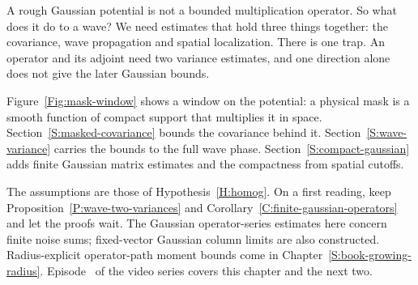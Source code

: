 A rough Gaussian potential is not a bounded multiplication operator. So what
does it do to a wave? We need estimates that hold three things together:
the covariance, wave propagation and spatial localization. There is one
trap. An operator and its adjoint need two variance estimates, and one
direction alone does not give the later Gaussian bounds.

Figure~\ref{Fig:mask-window} shows a window on the potential: a physical
mask is a smooth function of compact support that multiplies it in
space. Section~\ref{S:masked-covariance} bounds the covariance behind
it. Section~\ref{S:wave-variance} carries the bounds to the full wave
phase. Section~\ref{S:compact-gaussian} adds finite Gaussian matrix estimates
and the compactness from spatial cutoffs.

The assumptions are those of Hypothesis~\ref{H:homog}. On a
first reading, keep Proposition~\ref{P:wave-two-variances}
and Corollary~\ref{C:finite-gaussian-operators} and let the
proofs wait. The Gaussian operator-series estimates here concern
finite noise sums; fixed-vector Gaussian column limits are also
constructed. Radius-explicit operator-path moment bounds come in
Chapter~\ref{S:book-growing-radius}. Episode~
of the video series covers this chapter and the next two.
